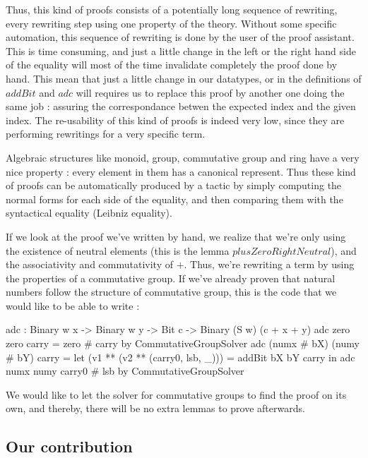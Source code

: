 Thus, this kind of proofs consists of a potentially long sequence of rewriting, every rewriting step using one property of the theory. Without some specific automation, this sequence of rewriting is done by the user of the proof assistant. This is time consuming, and just a little change in the left or the right hand side of the equality will most of the time invalidate completely the proof done by hand. This mean that just a little change in our datatypes, or in the definitions of $addBit$ and $adc$ will requires us to replace this proof by another one doing the same job : assuring the correspondance betwen the expected index and the given index. The re-usability of this kind of proofs is indeed very low, since they are performing rewritings for a very specific term.

Algebraic structures like monoid, group, commutative group and ring have a very nice property : every element in them has a canonical represent. Thus these kind of proofs can be automatically produced by a tactic by simply computing the normal forms for each side of the equality, and then comparing them with the syntactical equality (Leibniz equality).

If we look at the proof we've written by hand, we realize that we're only using the existence of neutral elements (this is the lemma $plusZeroRightNeutral$), and the associativity and commutativity of $+$. Thus, we're rewriting a term by using the properties of a commutative group.
If we've already proven that natural numbers follow the structure of commutative group, this is the code that we would like to be able to write :

\begin{code}[caption=Code we'd like to write for the addition of two binary numbers, captionpos=b, label=lst1:haskell2]
adc : Binary w x -> Binary w y -> Bit c 
     -> Binary (S w) (c + x + y)
adc zero zero carry = zero # carry 
        by CommutativeGroupSolver
adc (numx # bX) (numy # bY) carry
   = let (v1 ** (v2 ** (carry0, lsb, _))) = 
      addBit bX bY carry in
          adc numx numy carry0 # lsb 
        by CommutativeGroupSolver
\end{code}
We would like to let the solver for commutative groups to find the proof on its own, and thereby, there will be no extra lemmas to prove afterwards.

\subsection{Our contribution}

